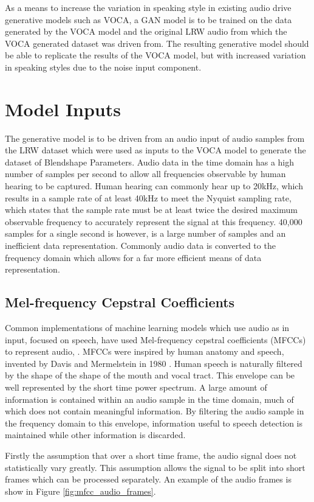 As a means to increase the variation in speaking style in existing audio drive generative models such as VOCA, a GAN model is to be trained on the data generated by the VOCA model and the original LRW audio from which the VOCA generated dataset was driven from.
The resulting generative model should be able to replicate the results of the VOCA model, but with increased variation in speaking styles due to the noise input component.

\section{Model Inputs}
The generative model is to be driven from an audio input of audio samples from the LRW dataset which were used as inputs to the VOCA model to generate the dataset of Blendshape Parameters.
Audio data in the time domain has a high number of samples per second to allow all frequencies observable by human hearing to be captured.
Human hearing can commonly hear up to 20kHz, which results in a sample rate of at least 40kHz to meet the Nyquist sampling rate, which states that the sample rate must be at least twice the desired maximum observable frequency to accurately represent the signal at this frequency.
40,000 samples for a single second is however, is a large number of samples and an inefficient data representation.
Commonly audio data is converted to the frequency domain which allows for a far more efficient means of data representation. 

\subsection{Mel-frequency Cepstral Coefficients}
Common implementations of machine learning models which use audio as in input, focused on speech, have used Mel-frequency cepstral coefficients (MFCCs) to represent audio, \cite{Holmberg2006, Milner2007, Murty2006}.
MFCCs were inspired by human anatomy and speech, invented by Davis and Mermelstein in 1980 \cite{Davis1980}.
Human speech is naturally filtered by the shape of the shape of the mouth and vocal tract.
This envelope can be well represented by the short time power spectrum.
A large amount of information is contained within an audio sample in the time domain, much of which does not contain meaningful information.
By filtering the audio sample in the frequency domain to this envelope, information useful to speech detection is maintained while other information is discarded.

Firstly the assumption that over a short time frame, the audio signal does not statistically vary greatly.
This assumption allows the signal to be split into short frames which can be processed separately.
An example of the audio frames is show in Figure \ref{fig:mfcc_audio_frames}.

